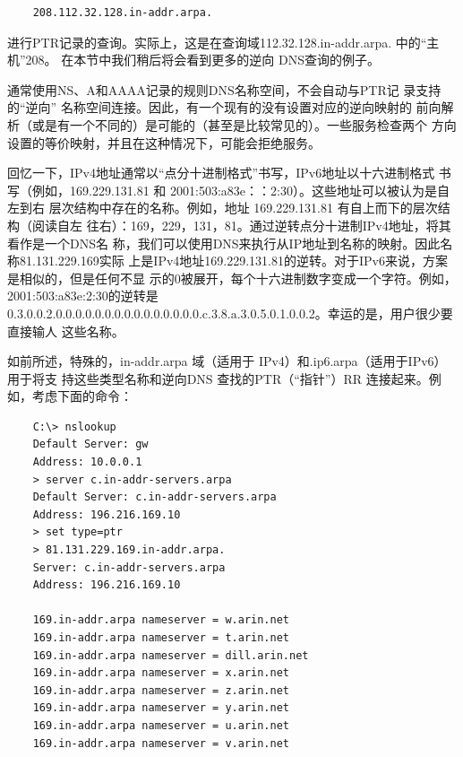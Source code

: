 
\begin{verbatim}
    208.112.32.128.in-addr.arpa.
\end{verbatim}

进行PTR记录的查询。实际上，这是在查询域112.32.128.in-addr.arpa. 中的“主机”208。
在本节中我们稍后将会看到更多的逆向 DNS查询的例子。

\begin{tcolorbox}
  通常使用NS、A和AAAA记录的规则DNS名称空间，不会自动与PTR记
  录支持的“逆向” 名称空间连接。因此，有一个现有的没有设置对应的逆向映射的
  前向解析（或是有一个不同的）是可能的（甚至是比较常见的）。一些服务检查两个
  方向设置的等价映射，并且在这种情况下，可能会拒绝服务。
\end{tcolorbox}

回忆一下，IPv4地址通常以“点分十进制格式”书写，IPv6地址以十六进制格式
书写（例如，169.229.131.81 和 2001:503:a83e：：2:30）。这些地址可以被认为是自左到右
层次结构中存在的名称。例如，地址 169.229.131.81 有自上而下的层次结构（阅读自左
往右）：169，229，131，81。通过逆转点分十进制IPv4地址，将其看作是一个DNS名
称，我们可以使用DNS来执行从IP地址到名称的映射。因此名称81.131.229.169实际
上是IPv4地址169.229.131.81的逆转。对于IPv6来说，方案是相似的，但是任何不显
示的0被展开，每个十六进制数字变成一个字符。例如，2001:503:a83e:2:30的逆转是
0.3.0.0.2.0.0.0.0.0.0.0.0.0.0.0.0.0.0.0.c.3.8.a.3.0.5.0.1.0.0.2。幸运的是，用户很少要直接输人
这些名称。

如前所述，特殊的，in-addr.arpa 域（适用于 IPv4）和.ip6.arpa（适用于IPv6）用于将支
持这些类型名称和逆向DNS 查找的PTR（“指针”）RR 连接起来。例如，考虑下面的命令：

\begin{verbatim}
    C:\> nslookup
    Default Server: gw
    Address: 10.0.0.1
    > server c.in-addr-servers.arpa
    Default Server: c.in-addr-servers.arpa
    Address: 196.216.169.10
    > set type=ptr
    > 81.131.229.169.in-addr.arpa.
    Server: c.in-addr-servers.arpa
    Address: 196.216.169.10

    169.in-addr.arpa nameserver = w.arin.net
    169.in-addr.arpa nameserver = t.arin.net
    169.in-addr.arpa nameserver = dill.arin.net
    169.in-addr.arpa nameserver = x.arin.net
    169.in-addr.arpa nameserver = z.arin.net
    169.in-addr.arpa nameserver = y.arin.net
    169.in-addr.arpa nameserver = u.arin.net
    169.in-addr.arpa nameserver = v.arin.net
\end{verbatim}

